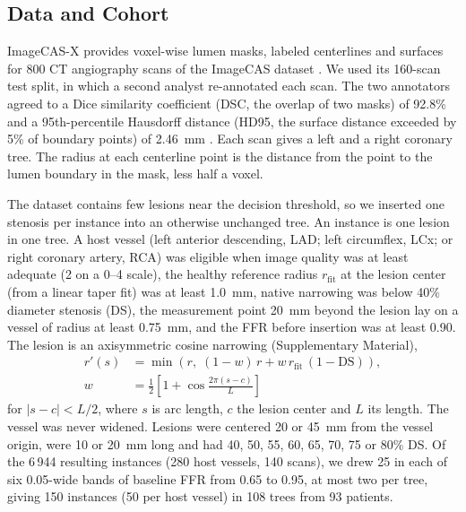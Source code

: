 \documentclass[journal]{IEEEtran}
\begin{document}
\subsection{Data and Cohort}
ImageCAS-X provides voxel-wise lumen masks, labeled centerlines and surfaces for 800 CT angiography scans of the
ImageCAS dataset \cite{zeng2023,bransby2026,imagecasx_data}. We used its 160-scan test split, in which a second
analyst re-annotated each scan. The two annotators agreed to a Dice similarity coefficient (DSC, the overlap of two
masks) of 92.8\% and a 95th-percentile Hausdorff distance (HD95, the surface distance exceeded by 5\% of boundary
points) of 2.46~mm \cite{bransby2026}. Each scan gives a left and a right coronary tree. The radius at each centerline point is the distance from the point to the
lumen boundary in the mask, less half a voxel.

The dataset contains few lesions near the decision threshold, so we inserted one stenosis per instance into an
otherwise unchanged tree. An instance is one lesion in one tree. A host vessel (left anterior descending, LAD; left circumflex, LCx; or right coronary artery, RCA) was eligible
when image quality was at least adequate (2 on a 0--4 scale), the healthy reference radius $r_\mathrm{fit}$ at the
lesion center (from a linear taper fit) was at least 1.0~mm, native narrowing was below 40\% diameter stenosis (DS),
the measurement point 20~mm beyond the lesion lay on a vessel of radius at least 0.75~mm, and the FFR before
insertion was at least 0.90. The lesion is an axisymmetric cosine narrowing (Supplementary Material),
\begin{equation}
\begin{aligned}
r'(s) &= \min\!\left(r,\; (1-w)\,r + w\,r_\mathrm{fit}\,(1-\mathrm{DS})\right),\\
w &= \tfrac{1}{2}\left[1+\cos\tfrac{2\pi (s-c)}{L}\right]
\end{aligned}
\end{equation}
for $|s-c|<L/2$, where $s$ is arc length, $c$ the lesion center and $L$ its length. The vessel was never widened.
Lesions were centered 20 or 45~mm from the vessel origin, were 10 or 20~mm long and had 40, 50, 55, 60, 65, 70, 75
or 80\% DS. Of the 6\,944 resulting instances (280 host vessels, 140 scans), we drew 25 in each of six 0.05-wide bands of
baseline FFR from 0.65 to 0.95, at most two per tree, giving 150 instances (50 per host vessel) in 108 trees from 93
patients.
\end{document}
